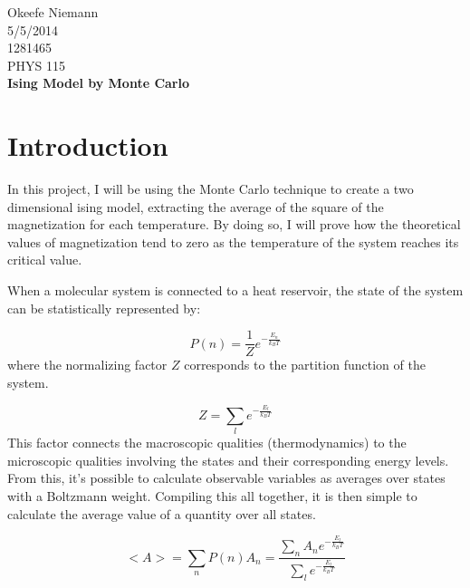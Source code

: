\documentclass[10pt]{article}
\begin{document}
 
\begin{center}
\large
\hfill Okeefe Niemann\\
\hfill 5/5/2014\\
\hfill 1281465\\
\hfill PHYS 115 \\
\LARGE \textbf{Ising Model by Monte Carlo}\\
\end{center}
\normalsize
\section{Introduction}
In this project, I will be using the Monte Carlo technique to create a two dimensional ising model, extracting the average of the square of the magnetization for each temperature. By doing so, I will prove how the theoretical values of magnetization tend to zero as the temperature of the system reaches its critical value.

When a molecular system is connected to a heat reservoir, the state of the system can be statistically represented by:

$$P(n) = \frac{1}{Z} e^{-\frac{E_n}{k_B T}}$$
where the normalizing factor $Z$ corresponds to the partition function of the system.

$$Z = \sum\limits_{l} e^{-\frac{E_l}{k_B T}}$$
This factor connects the macroscopic qualities (thermodynamics) to the microscopic qualities involving the states and their corresponding energy levels. From this, it's possible to calculate observable variables as averages over states with a Boltzmann weight. Compiling this all together, it is then simple to calculate the average value of a quantity over all states.

$$<A> = \sum\limits_{n} P(n)A_n = \frac{\sum\limits_{n} A_n e^{-\frac{E_l}{k_B T}}}{\sum\limits_{l} e^{-\frac{E_l}{k_B T}}}$$
\end{document}
